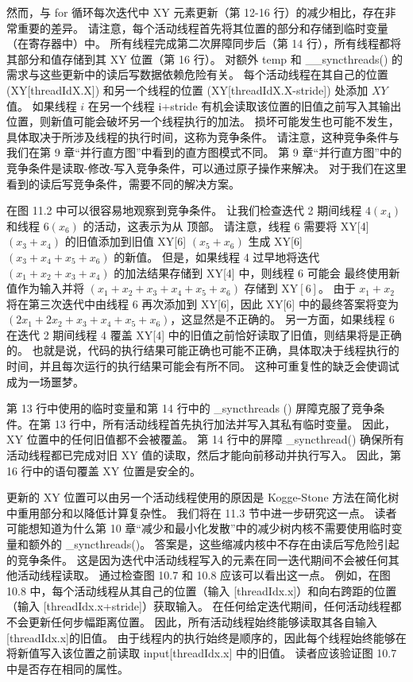 然而，与 for 循环每次迭代中 XY 元素更新（第 12-16 行）的减少相比，存在非常重要的差异。 请注意，每个活动线程首先将其位置的部分和存储到临时变量（在寄存器中）中。 所有线程完成第二次屏障同步后（第 14 行），所有线程都将其部分和值存储到其 $\mathrm{XY}$ 位置（第 16 行）。 对额外 temp 和 \_\_syncthreads() 的需求与这些更新中的读后写数据依赖危险有关。 每个活动线程在其自己的位置 (XY[threadIdX.X]) 和另一个线程的位置 (XY[threadIdX.X-stride]) 处添加 $X Y$ 值。 如果线程 $i$ 在另一个线程 i+stride 有机会读取该位置的旧值之前写入其输出位置，则新值可能会破坏另一个线程执行的加法。 损坏可能发生也可能不发生，具体取决于所涉及线程的执行时间，这称为竞争条件。 请注意，这种竞争条件与我们在第 9 章“并行直方图”中看到的直方图模式不同。 第 9 章“并行直方图”中的竞争条件是读取-修改-写入竞争条件，可以通过原子操作来解决。 对于我们在这里看到的读后写竞争条件，需要不同的解决方案。

在图 11.2 中可以很容易地观察到竞争条件。 让我们检查迭代 2 期间线程 $4\left(x_{4}\right)$ 和线程 $6\left(x_{6}\right)$ 的活动，这表示为从 顶部。 请注意，线程 6 需要将 XY[4] $\left(x_{3}+x_{4}\right)$ 的旧值添加到旧值 XY[6] $\left(x_{5}+x_ {6}\right)$ 生成 XY[6] $\left(x_{3}+x_{4}+x_{5}+x_{6}\right)$ 的新值。 但是，如果线程 4 过早地将迭代 $\left(x_{1}+x_{2}+x_{3}+x_{4}\right)$ 的加法结果存储到 XY[4] 中，则线程 6 可能会 最终使用新值作为输入并将 $\left(x_{1}+x_{2}+x_{3}+x_{4}+x_{5}+x_{6}\right)$ 存储到 $ \mathrm{XY}[6]$。 由于 $x_{1}+x_{2}$ 将在第三次迭代中由线程 6 再次添加到 XY[6]，因此 XY[6] 中的最终答案将变为 $\left(2 x_{1}+2 x_{2}+x_{3}+x_{4}+x_{5}+x_{6}\right)$，这显然是不正确的。 另一方面，如果线程 6 在迭代 2 期间线程 4 覆盖 XY[4] 中的旧值之前恰好读取了旧值，则结果将是正确的。 也就是说，代码的执行结果可能正确也可能不正确，具体取决于线程执行的时间，并且每次运行的执行结果可能会有所不同。 这种可重复性的缺乏会使调试成为一场噩梦。

第 13 行中使用的临时变量和第 14 行中的 \_syncthreads () 屏障克服了竞争条件。在第 13 行中，所有活动线程首先执行加法并写入其私有临时变量。 因此，XY 位置中的任何旧值都不会被覆盖。 第 14 行中的屏障 \_syncthread() 确保所有活动线程都已完成对旧 XY 值的读取，然后才能向前移动并执行写入。 因此，第 16 行中的语句覆盖 XY 位置是安全的。

更新的 XY 位置可以由另一个活动线程使用的原因是 Kogge-Stone 方法在简化树中重用部分和以降低计算复杂性。 我们将在 11.3 节中进一步研究这一点。 读者可能想知道为什么第 10 章“减少和最小化发散”中的减少树内核不需要使用临时变量和额外的 \_syncthreads()。 答案是，这些缩减内核中不存在由读后写危险引起的竞争条件。 这是因为迭代中活动线程写入的元素在同一迭代期间不会被任何其他活动线程读取。 通过检查图 10.7 和 10.8 应该可以看出这一点。 例如，在图 10.8 中，每个活动线程从其自己的位置（输入 [threadIdx.x]）和向右跨距的位置（输入 [threadIdx.x+stride]）获取输入。 在任何给定迭代期间，任何活动线程都不会更新任何步幅距离位置。 因此，所有活动线程始终能够读取其各自输入[threadIdx.x]的旧值。 由于线程内的执行始终是顺序的，因此每个线程始终能够在将新值写入该位置之前读取 input[threadIdx.x] 中的旧值。 读者应该验证图 10.7 中是否存在相同的属性。

